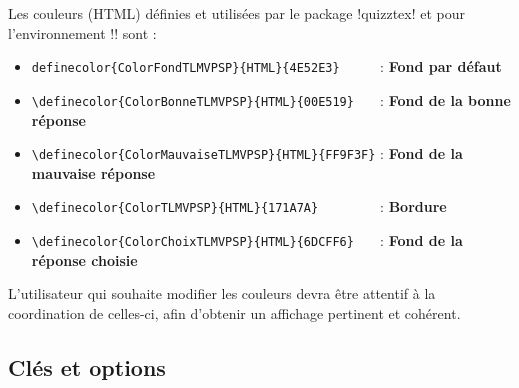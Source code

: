 \documentclass[french,a4paper,11pt]{article}
\begin{document}
\begin{tipblock}
Les couleurs (HTML) définies et utilisées par le package \packagetex!quizztex! et pour l'environnement \motcletex!\QuizzMillions! sont :

\begin{itemize}[leftmargin=*]
	\item \verb!definecolor{ColorFondTLMVPSP}{HTML}{4E52E3}     ! : \textcolor{ColorFondTLMVPSP}{\textsf{\textbf{Fond par défaut}}}
	\item \verb!\definecolor{ColorBonneTLMVPSP}{HTML}{00E519}   ! : \textcolor{ColorBonneTLMVPSP}{\textsf{\textbf{Fond de la bonne réponse}}}
	\item \verb!\definecolor{ColorMauvaiseTLMVPSP}{HTML}{FF9F3F}! : \textcolor{ColorMauvaiseTLMVPSP}{\textsf{\textbf{Fond de la mauvaise réponse}}}
	\item \verb!\definecolor{ColorTLMVPSP}{HTML}{171A7A}        ! : \textcolor{ColorTLMVPSP}{\textsf{\textbf{Bordure}}}
	\item \verb!\definecolor{ColorChoixTLMVPSP}{HTML}{6DCFF6}   ! : \textcolor{ColorChoixTLMVPSP}{\textsf{\textbf{Fond de la réponse choisie}}}
\end{itemize}

L'utilisateur qui souhaite modifier les couleurs devra être attentif à la coordination de celles-ci, afin d'obtenir un affichage pertinent et cohérent.
\end{tipblock}

\begin{DemoCode}[]
\QuizzPrendrePlace{\lipsum[1][1-2]}
{\lipsum[2][1]}{\lipsum[2][2]}{\lipsum[2][3]}{\lipsum[2][5]}
\end{DemoCode}

\subsection{Clés et options}
\end{document}
